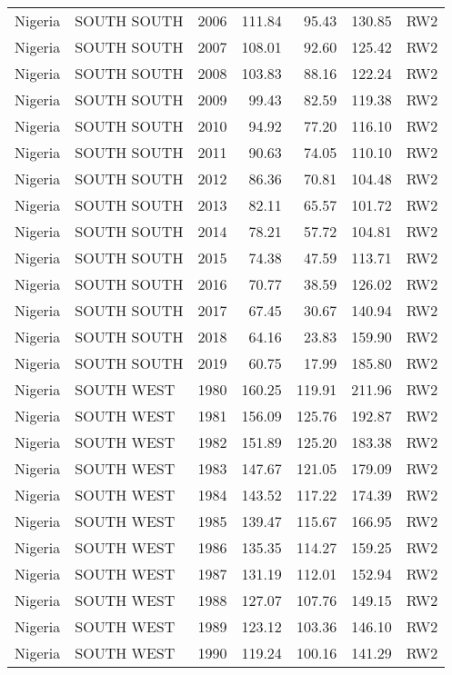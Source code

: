 \begin{longtable}{lllrrrl}
  Nigeria & SOUTH SOUTH & 2006 & 111.84 & 95.43 & 130.85 & RW2 \\ 
  Nigeria & SOUTH SOUTH & 2007 & 108.01 & 92.60 & 125.42 & RW2 \\ 
  Nigeria & SOUTH SOUTH & 2008 & 103.83 & 88.16 & 122.24 & RW2 \\ 
  Nigeria & SOUTH SOUTH & 2009 & 99.43 & 82.59 & 119.38 & RW2 \\ 
  Nigeria & SOUTH SOUTH & 2010 & 94.92 & 77.20 & 116.10 & RW2 \\ 
  Nigeria & SOUTH SOUTH & 2011 & 90.63 & 74.05 & 110.10 & RW2 \\ 
  Nigeria & SOUTH SOUTH & 2012 & 86.36 & 70.81 & 104.48 & RW2 \\ 
  Nigeria & SOUTH SOUTH & 2013 & 82.11 & 65.57 & 101.72 & RW2 \\ 
  Nigeria & SOUTH SOUTH & 2014 & 78.21 & 57.72 & 104.81 & RW2 \\ 
  Nigeria & SOUTH SOUTH & 2015 & 74.38 & 47.59 & 113.71 & RW2 \\ 
  Nigeria & SOUTH SOUTH & 2016 & 70.77 & 38.59 & 126.02 & RW2 \\ 
  Nigeria & SOUTH SOUTH & 2017 & 67.45 & 30.67 & 140.94 & RW2 \\ 
  Nigeria & SOUTH SOUTH & 2018 & 64.16 & 23.83 & 159.90 & RW2 \\ 
  Nigeria & SOUTH SOUTH & 2019 & 60.75 & 17.99 & 185.80 & RW2 \\ 
  Nigeria & SOUTH WEST & 1980 & 160.25 & 119.91 & 211.96 & RW2 \\ 
  Nigeria & SOUTH WEST & 1981 & 156.09 & 125.76 & 192.87 & RW2 \\ 
  Nigeria & SOUTH WEST & 1982 & 151.89 & 125.20 & 183.38 & RW2 \\ 
  Nigeria & SOUTH WEST & 1983 & 147.67 & 121.05 & 179.09 & RW2 \\ 
  Nigeria & SOUTH WEST & 1984 & 143.52 & 117.22 & 174.39 & RW2 \\ 
  Nigeria & SOUTH WEST & 1985 & 139.47 & 115.67 & 166.95 & RW2 \\ 
  Nigeria & SOUTH WEST & 1986 & 135.35 & 114.27 & 159.25 & RW2 \\ 
  Nigeria & SOUTH WEST & 1987 & 131.19 & 112.01 & 152.94 & RW2 \\ 
  Nigeria & SOUTH WEST & 1988 & 127.07 & 107.76 & 149.15 & RW2 \\ 
  Nigeria & SOUTH WEST & 1989 & 123.12 & 103.36 & 146.10 & RW2 \\ 
  Nigeria & SOUTH WEST & 1990 & 119.24 & 100.16 & 141.29 & RW2 \\ 

\end{longtable}
